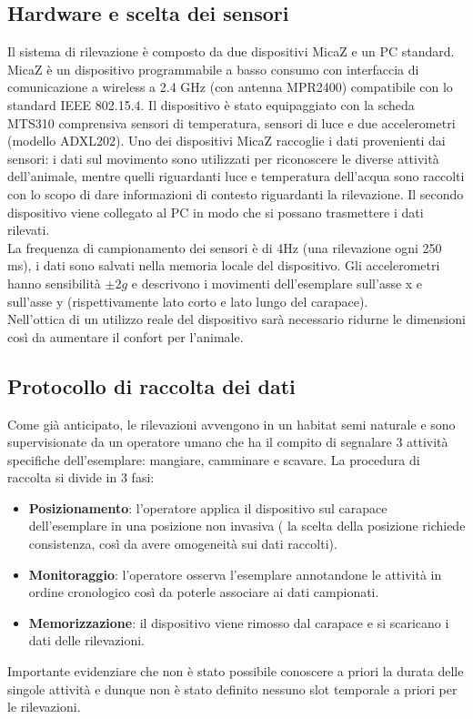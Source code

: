 \documentclass[12pt]{article}
\begin{document}
 		\subsection{Hardware e scelta dei sensori}  
 			Il sistema di rilevazione è composto da due dispositivi MicaZ e un PC standard. MicaZ è un dispositivo programmabile a basso consumo con interfaccia di comunicazione a wireless a 2.4 GHz (con antenna MPR2400) compatibile con lo standard IEEE 802.15.4. Il dispositivo è stato equipaggiato con la scheda MTS310 comprensiva sensori di temperatura, sensori di luce e due accelerometri (modello ADXL202). Uno dei  dispositivi MicaZ raccoglie i dati provenienti dai sensori: i dati sul movimento sono utilizzati per riconoscere le diverse attività dell'animale, mentre quelli riguardanti luce e temperatura dell'acqua sono raccolti con lo scopo di dare informazioni di contesto riguardanti la rilevazione. Il secondo dispositivo viene collegato al PC in modo che si possano trasmettere i dati rilevati.\\
 			La frequenza di campionamento dei sensori è di 4Hz (una rilevazione ogni 250 ms), i dati sono salvati nella memoria locale del dispositivo. Gli accelerometri hanno sensibilità $\pm 2g$ e descrivono i movimenti dell'esemplare sull'asse x e sull'asse y (rispettivamente lato corto e lato lungo del carapace).\\
 			Nell'ottica di un utilizzo reale del dispositivo sarà necessario ridurne le dimensioni così da aumentare il confort per l'animale.
 		\subsection{Protocollo di raccolta dei dati}
 			Come già anticipato, le rilevazioni avvengono in un habitat semi naturale e sono supervisionate da un operatore umano che ha il compito di segnalare 3 attività specifiche dell'esemplare: mangiare, camminare e scavare. La procedura di raccolta si divide in 3 fasi: 
 			\begin{itemize}
 				\item \textbf{Posizionamento}: l'operatore applica il dispositivo sul carapace dell'esemplare in una posizione  non invasiva ( la scelta della posizione richiede consistenza, così da avere omogeneità sui dati raccolti).
 				\item \textbf{Monitoraggio}: l'operatore osserva l'esemplare annotandone le attività in ordine cronologico così da poterle associare ai dati campionati.
 				\item \textbf{Memorizzazione}: il dispositivo viene rimosso dal carapace e si scaricano i dati delle rilevazioni.
 			\end{itemize}
 			Importante evidenziare che non è stato possibile conoscere a priori la durata delle singole attività e dunque non è stato definito nessuno slot temporale a priori per le rilevazioni.
\end{document}
